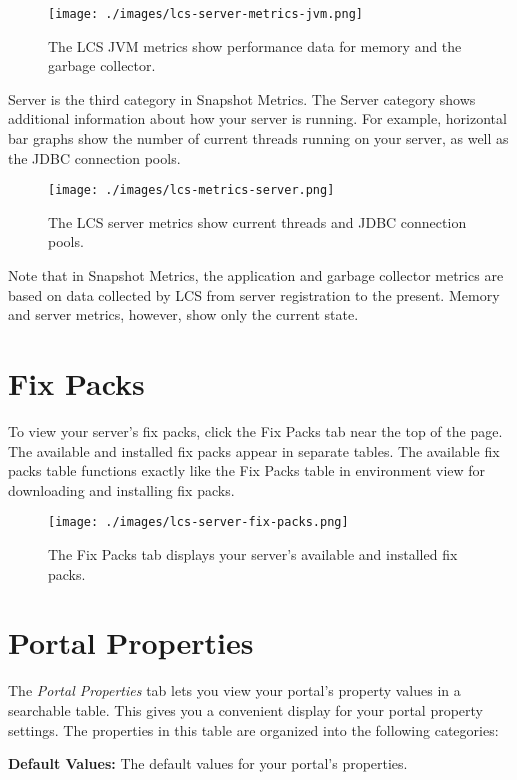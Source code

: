 \begin{figure}
\centering
\texttt{[image: ./images/lcs-server-metrics-jvm.png]}
\caption{The LCS JVM metrics show performance data for memory and the
garbage collector.}
\end{figure}

Server is the third category in Snapshot Metrics. The Server category
shows additional information about how your server is running. For
example, horizontal bar graphs show the number of current threads
running on your server, as well as the JDBC connection pools.

\begin{figure}
\centering
\texttt{[image: ./images/lcs-metrics-server.png]}
\caption{The LCS server metrics show current threads and JDBC connection
pools.}
\end{figure}

Note that in Snapshot Metrics, the application and garbage collector
metrics are based on data collected by LCS from server registration to
the present. Memory and server metrics, however, show only the current
state.

\section{Fix Packs}\label{fix-packs-1}

To view your server's fix packs, click the Fix Packs tab near the top of
the page. The available and installed fix packs appear in separate
tables. The available fix packs table functions exactly like the Fix
Packs table in environment view for downloading and installing fix
packs.

\begin{figure}
\centering
\texttt{[image: ./images/lcs-server-fix-packs.png]}
\caption{The Fix Packs tab displays your server's available and
installed fix packs.}
\end{figure}

\section{Portal Properties}\label{portal-properties}

The \emph{Portal Properties} tab lets you view your portal's property
values in a searchable table. This gives you a convenient display for
your portal property settings. The properties in this table are
organized into the following categories:

\textbf{Default Values:} The default values for your portal's
properties.

